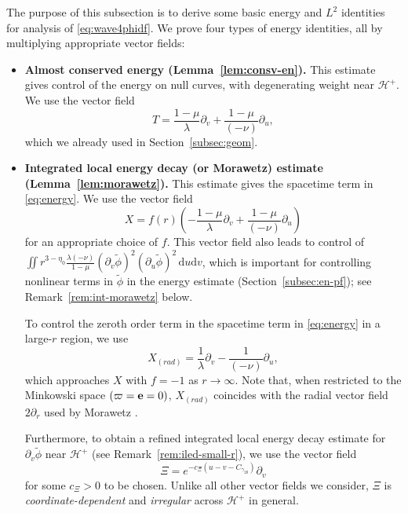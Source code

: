 \documentclass[10pt, reqno]{amsart}
\theoremstyle{definition}
\theoremstyle{remark}
\theoremstyle{conjecture}
\numberwithin{equation}{section}
\newcommand{\ud}{\mathrm{d}}
\newcommand{\rd}{\partial}
\newcommand{\0}{\emptyset}
\newcommand{\gmm}{\gamma}
\newcommand{\lmb}{\lambda}
\newcommand{\bfe}{{\bf e}}
\newcommand{\calH}{\mathcal H}
\newcommand{\dur}{\nu}
\newcommand{\dvr}{\lmb}
\newcommand{\EH}{\calH^{+}}
\newcommand{\e}{\bfe}							%
\newcommand{\phibg}{\overline{\phi}}				%
\newcommand{\phidf}{\widetilde{\phi}}				%
\begin{document}
The purpose of this subsection is to derive some basic energy and $L^{2}$ identities for analysis of \eqref{eq:wave4phidf}.
We prove four types of energy identities, all by multiplying appropriate vector fields:
\begin{itemize}
\item {\bf Almost conserved energy (Lemma~\ref{lem:consv-en}).} 
This estimate gives control of the energy on null curves, with degenerating weight near $\EH$. We use the vector field
\begin{equation} \label{eq:vf-T}
	T = \frac{1-\mu}{\dvr} \rd_{v} + \frac{1-\mu}{(-\dur)} \rd_{u} ,
\end{equation}
which we already used in Section~\ref{subsec:geom}.

\item {\bf Integrated local energy decay (or Morawetz) estimate (Lemma~\ref{lem:morawetz}).}
This estimate gives the spacetime term in \eqref{eq:energy}. We use the vector field
\begin{equation} \label{eq:vf-X}
	X = f(r) \left( - \frac{1-\mu}{\dvr} \rd_{v} + \frac{1-\mu}{(-\dur)} \rd_{u}\right)
\end{equation}
for an appropriate choice of $f$. This vector field also leads to control of 
$\iint r^{3- \eta_{0}} \frac{\dvr (-\dur)}{1-\mu} (\rd_{v} \phidf)^{2} (\rd_{u} \phidf)^{2} \, \ud u \ud v$, which is important for controlling nonlinear terms in $\phidf$ in the energy estimate (Section~\ref{subsec:en-pf}); see Remark~\ref{rem:int-morawetz} below.

To control the zeroth order term in the spacetime term in \eqref{eq:energy} in a large-$r$ region, we use 
\begin{equation} \label{eq:vf-Xrad}
	X_{(rad)} = \frac{1}{\dvr} \rd_{v} - \frac{1}{(-\dur)} \rd_{u},
\end{equation}
which approaches $X$ with $f = -1$ as $r \to \infty$. Note that, when restricted to the Minkowski space $(\varpi = \e = 0)$, $X_{(rad)}$ coincides with the radial vector field $2 \rd_{r}$ used by Morawetz \cite{Morawetz}. 

Furthermore, to obtain a refined integrated local energy decay estimate for $\rd_{v} \phidf$ near $\EH$ (see Remark~\ref{rem:iled-small-r}), we use the vector field
\begin{equation} \label{eq:vf-Xi}
	\Xi = e^{-c_{\Xi} (u - v - C_{\gmm_{20}})} \rd_{v}
\end{equation}
for some $c_{\Xi} > 0$ to be chosen. Unlike all other vector fields we consider, $\Xi$ is \emph{coordinate-dependent} and \emph{irregular} across $\EH$ in general.


\end{itemize}
\end{document}
